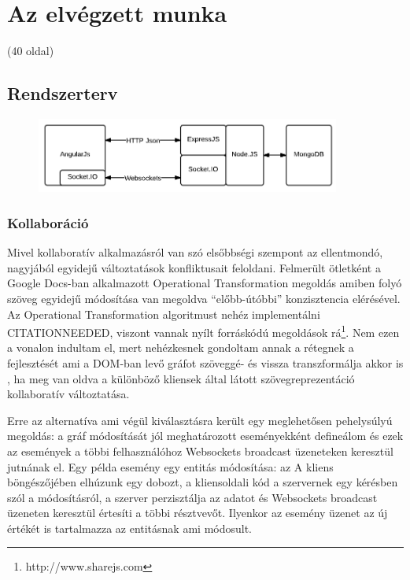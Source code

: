 \chapter{Az elvégzett munka}

(40 oldal)

\section{Rendszerterv}
\begin{figure}[!ht]
\centering
\includegraphics[width=100mm,keepaspectratio]{figures/Rendszerterv.png}\\
\end{figure}

\subsection{Kollaboráció}

Mivel kollaboratív alkalmazásról van szó elsőbbségi szempont az ellentmondó, nagyjából egyidejű változtatások konfliktusait feloldani. Felmerült ötletként a Google Docs-ban alkalmazott Operational Transformation megoldás amiben folyó szöveg egyidejű módosítása van megoldva ``előbb-útóbbi'' konzisztencia elérésével. Az Operational Transformation algoritmust nehéz implementálni CITATIONNEEDED, viszont vannak nyílt forráskódú megoldások rá\footnote{http://www.sharejs.com}. Nem ezen a vonalon indultam el, mert nehézkesnek gondoltam annak a rétegnek a fejlesztését ami a DOM-ban levő gráfot szöveggé- és vissza transzformálja akkor is , ha meg van oldva a különböző kliensek által látott szövegreprezentáció kollaboratív változtatása. 

Erre az alternatíva ami végül kiválasztásra került egy meglehetősen pehelysúlyú megoldás: a gráf módosítását jól meghatározott eseményekként defineálom és ezek az események a többi felhasználóhoz Websockets broadcast üzeneteken keresztül jutnának el. Egy példa esemény egy entitás módosítása: az A kliens böngészőjében elhúzunk egy dobozt, a kliensoldali kód a szervernek egy kérésben szól a módosításról, a szerver perzisztálja az adatot és Websockets broadcast üzeneten keresztül értesíti a többi résztvevőt. Ilyenkor az esemény üzenet az új értékét is tartalmazza az entitásnak ami módosult. 

